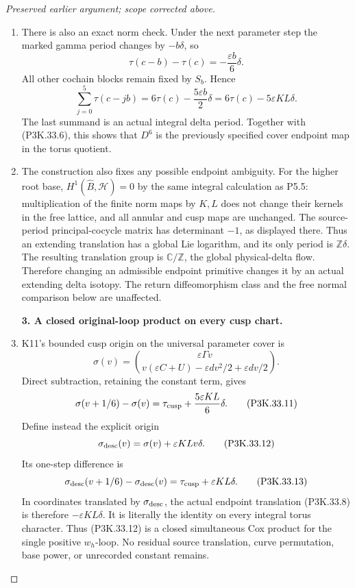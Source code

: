 \begin{proof}[Preserved earlier argument; scope corrected above]
\begin{enumerate}[label=\arabic*.]
\item There is also an exact norm check. Under the next parameter
step the marked gamma period changes by \(-b\delta\), so
\[
 \tau(c-b)-\tau(c)=-\frac{\varepsilon b}{6}\delta.
\]
All other cochain blocks remain fixed by \(S_b\). Hence
\[
 \sum_{j=0}^5\tau(c-jb)=6\tau(c)-\frac{5\varepsilon b}{2}\delta
                      =6\tau(c)-5\varepsilon KL\delta. \tag{P3K.33.10}
\]
The last summand is an actual integral delta period. Together
with (P3K.33.6), this shows that \(D^6\) is the previously specified
cover endpoint map in the torus quotient.

\item The construction also fixes any possible endpoint ambiguity.
For the higher root base, \(H^1(\widehat B,\mathcal H)=0\)
by the same integral calculation as P5.5: multiplication of the
finite norm maps by \(K,L\) does not change their kernels in
the free lattice, and all annular and cusp maps are unchanged.
The source-period principal-cocycle matrix has determinant
\(-1\), as displayed there. Thus an extending translation has
a global Lie logarithm, and its only period is \(\mathbb Z\delta\).
The resulting translation group is \(\mathbb C/\mathbb Z\),
the global physical-delta flow. Therefore changing an admissible
endpoint primitive changes it by an actual extending delta
isotopy. The return diffeomorphism class and the free normal
comparison below are unaffected.

\par\medskip\noindent\textbf{3. A closed original-loop product on every cusp chart.}\enspace

\item K11's bounded cusp origin on the universal parameter cover is
\[
 \sigma(v)=
 \binom{\varepsilon\Gamma v}
       {v(\varepsilon C+U)-\varepsilon dv^2/2+\varepsilon dv/2}.
\]
Direct subtraction, retaining the constant term, gives
\[
 \sigma(v+1/6)-\sigma(v)
      =\tau_{\rm cusp}+\frac{5\varepsilon KL}{6}\delta. \tag{P3K.33.11}
\]
Define instead the explicit origin
\[
             \sigma_{\rm desc}(v)=\sigma(v)+\varepsilon KLv\delta.
                                                               \tag{P3K.33.12}
\]
Its one-step difference is
\[
 \sigma_{\rm desc}(v+1/6)-\sigma_{\rm desc}(v)
                    =\tau_{\rm cusp}+\varepsilon KL\delta. \tag{P3K.33.13}
\]
In coordinates translated by \(\sigma_{\rm desc}\), the actual
endpoint translation (P3K.33.8) is therefore \(-\varepsilon KL\delta\).
It is literally the identity on every integral torus character.
Thus (P3K.33.12) is a closed simultaneous Cox product for the single
positive \(w_h\)-loop. No residual source translation, curve
permutation, base power, or unrecorded constant remains.


\end{enumerate}
\end{proof}
